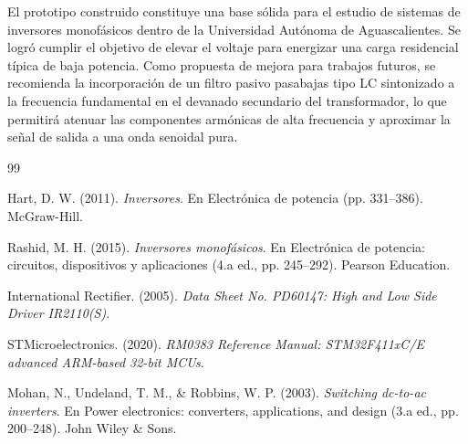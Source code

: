 \documentclass[12pt,a4paper]{article}
\begin{document}
El prototipo construido constituye una base sólida para el estudio de sistemas de inversores monofásicos dentro de la Universidad Autónoma de Aguascalientes. Se logró cumplir el objetivo de elevar el voltaje para energizar una carga residencial típica de baja potencia. Como propuesta de mejora para trabajos futuros, se recomienda la incorporación de un filtro pasivo pasabajas tipo LC sintonizado a la frecuencia fundamental en el devanado secundario del transformador, lo que permitirá atenuar las componentes armónicas de alta frecuencia y aproximar la señal de salida a una onda senoidal pura.

\begin{thebibliography}{99}

Hart, D. W. (2011). \textit{Inversores}. En Electrónica de potencia (pp. 331--386). McGraw-Hill.

Rashid, M. H. (2015). \textit{Inversores monofásicos}. En Electrónica de potencia: circuitos, dispositivos y aplicaciones (4.a ed., pp. 245--292). Pearson Education.

International Rectifier. (2005). \textit{Data Sheet No. PD60147: High and Low Side Driver IR2110(S)}.

STMicroelectronics. (2020). \textit{RM0383 Reference Manual: STM32F411xC/E advanced ARM-based 32-bit MCUs}.

Mohan, N., Undeland, T. M., \& Robbins, W. P. (2003). \textit{Switching dc-to-ac inverters}. En Power electronics: converters, applications, and design (3.a ed., pp. 200--248). John Wiley \& Sons.

\end{thebibliography}
\end{document}
